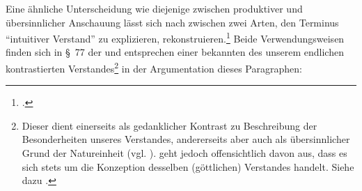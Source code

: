 Eine ähnliche Unterscheidung wie diejenige zwischen produktiver und
übersinnlicher Anschauung lässt sich nach
zwischen zwei Arten, den Terminus \enquote{intuitiver Verstand} zu explizieren,
rekonstruieren.\footcite[Vgl.][\pno~178\,f.]{Foerster:DieBedeutungvonSS7677deremphKritikderUrteilskraftfuerdieEntwicklungdernachkantischenPhilosophieTeil12002}
Beide Verwendungsweisen finden sich in \S~77 der
 und entsprechen einer bekannten
 des unserem endlichen kontrastierten Verstandes\footnote{\label{FussnoteDoppelfunktion}Dieser dient einerseits als
gedanklicher Kontrast zu Beschreibung der Besonderheiten unseres Verstandes, andererseits aber auch als
übersinnlicher Grund der Natureinheit \mkbibparens{vgl.
\cite[][68]{Duesing:DieTeleologieinKantsWeltbegriff1968}}.
 geht jedoch
offensichtlich davon aus, dass es sich stets um die Konzeption desselben
(göttlichen) Verstandes handelt. Siehe dazu
\cite[][66--74]{Duesing:DieTeleologieinKantsWeltbegriff1968}.} in
der Argumentation dieses Paragraphen:
